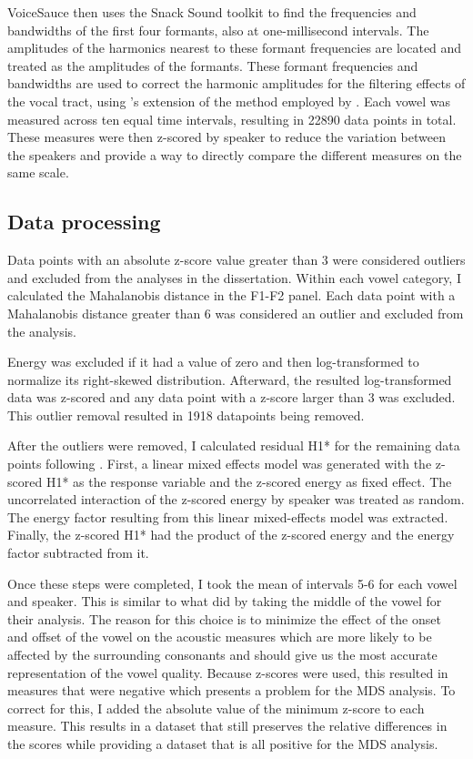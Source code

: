 VoiceSauce then uses the Snack Sound toolkit \citep{sjolanderSnackSoundToolkit2004} to find the frequencies and bandwidths of the first four formants, also at one-millisecond intervals. The amplitudes of the harmonics nearest to these formant frequencies are located and treated as the amplitudes of the formants. These formant frequencies and bandwidths are used to correct the harmonic amplitudes for the filtering effects of the vocal tract, using \citeauthor{iseliAgeSexVowel2007}'s \citeyear{iseliAgeSexVowel2007} extension of the method employed by \citet{hansonGlottalCharacteristicsFemale1997}. Each vowel was measured across ten equal time intervals, resulting in 22890 data points in total. These measures were then z-scored by speaker to reduce the variation between the speakers and provide a way to directly compare the different measures on the same scale.

\subsection{Data processing} \label{sec:acousticlandscape:processing}
Data points with an absolute z-score value greater than 3 were considered outliers and excluded from the analyses in the dissertation. Within each vowel category, I calculated the Mahalanobis distance in the F1-F2 panel. Each data point with a Mahalanobis distance greater than 6 was considered an outlier and excluded from the analysis.  

Energy was excluded if it had a value of zero and then log-transformed to normalize its right-skewed distribution. Afterward, the resulted log-transformed data was z-scored and any data point with a z-score larger than 3 was excluded. This outlier removal resulted in 1918 datapoints being removed. 

After the outliers were removed, I calculated residual H1* for the remaining data points following \citet{chaiH1H2Acoustic2022}. First, a linear mixed effects model was generated with the z-scored H1* as the response variable and the z-scored energy as fixed effect. The uncorrelated interaction of the z-scored energy by speaker was treated as random. The energy factor resulting from this linear mixed-effects model was extracted. Finally, the z-scored H1* had the product of the z-scored energy and the energy factor subtracted from it.

Once these steps were completed, I took the mean of intervals 5-6 for each vowel and speaker. This is similar to what \citet{keatingCrosslanguageAcousticSpace2023} did by taking the middle of the vowel for their analysis. The reason for this choice is to minimize the effect of the onset and offset of the vowel on the acoustic measures which are more likely to be affected by the surrounding consonants and should give us the most accurate representation of the vowel quality. Because z-scores were used, this resulted in measures that were negative which presents a problem for the MDS analysis. To correct for this, I added the absolute value of the minimum z-score to each measure. This results in a dataset that still preserves the relative differences in the scores while providing a dataset that is all positive for the MDS analysis.


